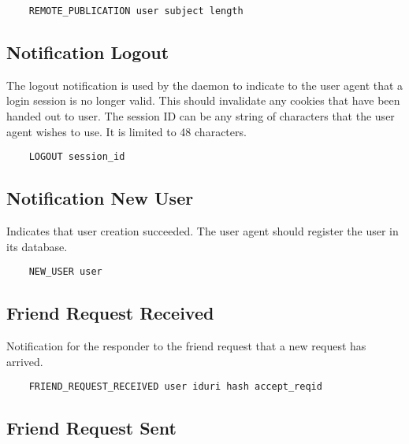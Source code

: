 \documentclass[letterpaper,11pt,oneside]{article}
\begin{document}
\vspace{10pt}
\begin{verbatim}
    REMOTE_PUBLICATION user subject length 
\end{verbatim}
\vspace{10pt}

\subsection{Notification Logout}

The logout notification is used by the daemon to indicate to the user agent
that a login session is no longer valid. This should invalidate any cookies
that have been handed out to user. The session ID can be any string of
characters that the user agent wishes to use. It is limited to 48 characters.

\vspace{10pt}
\begin{verbatim}
    LOGOUT session_id
\end{verbatim}
\vspace{10pt}

\subsection{Notification New User}

Indicates that user creation succeeded. The user agent should register the user
in its database.

\vspace{10pt}
\begin{verbatim}
    NEW_USER user
\end{verbatim}
\vspace{10pt}

\subsection{Friend Request Received}

Notification for the responder to the friend request that a new request has
arrived.

\vspace{10pt}
\begin{verbatim}
    FRIEND_REQUEST_RECEIVED user iduri hash accept_reqid
\end{verbatim}
\vspace{10pt}

\subsection{Friend Request Sent}
\end{document}
